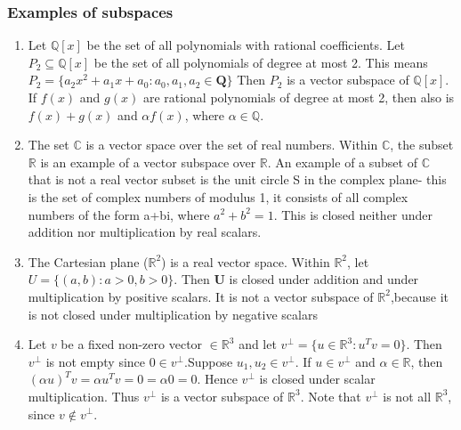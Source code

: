 \documentclass[a4paper, 9pt]{extarticle}
\begin{document}
\subsubsection*{Examples of subspaces}
\begin{enumerate}
  \item Let $\mathbb{Q}[x]$ be the set of all polynomials with rational coefficients. Let $P_2 \subseteq \mathbb{Q}[x]$ be the set of all polynomials of degree at most 2. This means $P_2 = \{a_2x^2 + a_1x + a_0: a_0, a_1, a_2 \in \mathbf{Q}\}$ Then $P_2$ is a vector subspace of $\mathbb{Q}[x]$. If $f(x)$ and $g(x)$ are rational polynomials of degree at most 2, then also is $f(x) + g(x)$ and $\alpha f(x)$, where $\alpha \in \mathbb{Q}$.
  \item The set $\mathbb{C}$ is a vector space over the set of real numbers. Within $\mathbb{C}$, the subset $\mathbb{R}$ is an example of a vector subspace over $\mathbb{R}.$ An example of a subset of $\mathbb{C}$ that is not a real vector subset is the unit circle S in the complex plane- this is the set of complex numbers of modulus 1, it consists of all complex numbers of the form a+bi, where $a^2+b^2=1.$ This is closed neither under addition nor multiplication by real scalars.
  \item The Cartesian plane ($\mathbb{R}^2$) is a real vector space. Within $\mathbb{R}^2$, let $U=\{(a,b):a > 0,b >0\}$. Then $\mathbf{U}$ is closed under addition and under multiplication by positive scalars. It is not a vector subspace of $\mathbb{R}^2$,because it is not closed under multiplication by negative scalars
  \item Let $v$ be a fixed non-zero vector $\in \mathbb{R}^3$ and let $v^{\perp} = \{u \in \mathbb{R}^3: u^Tv = 0\}$. Then $v^{\perp}$ is not empty since $0 \in v^{\perp}$.Suppose $u_1, u_2 \in v^{\perp}$. If $u \in v^{\perp}$ and $\alpha \in \mathbb{R}$, then $(\alpha u)^T v = \alpha u^T v = 0 = \alpha 0 = 0$. Hence $v^{\perp}$ is closed under scalar multiplication. Thus $v^{\perp}$ is a vector subspace of $\mathbb{R}^3$. Note that $v^{\perp}$ is not all $\mathbb{R}^3$, since $v \notin v^{\perp}$.
\end{enumerate}
\end{document}
